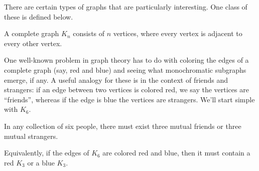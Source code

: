 \documentclass[../m55main.tex]{chapters}
\begin{document}
There are certain types of graphs that are particularly interesting.
One class of these is defined below.

\begin{definition}
    A complete graph $K_n$ consists of $n$ vertices, where every vertex is adjacent to every other vertex.
\end{definition}

One well-known problem in graph theory has to do with coloring the edges of a complete graph (say, red and blue) and seeing what monochromatic subgraphs emerge, if any.
A useful analogy for these is in the context of friends and strangers: if an edge between two vertices is colored red, we say the vertices are ``friends'', whereas if the edge is blue the vertices are strangers.
We'll start simple with $K_6$.

\begin{theorem}
    In any collection of six people, there must exist three mutual friends or three mutual strangers.

    Equivalently, if the edges of $K_6$ are colored red and blue, then it must contain a red $K_3$ or a blue $K_3$.
\end{theorem}
\end{document}
